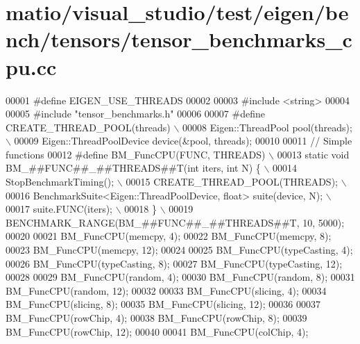 \hypertarget{matio_2visual__studio_2test_2eigen_2bench_2tensors_2tensor__benchmarks__cpu_8cc_source}{}\section{matio/visual\+\_\+studio/test/eigen/bench/tensors/tensor\+\_\+benchmarks\+\_\+cpu.cc}
\label{matio_2visual__studio_2test_2eigen_2bench_2tensors_2tensor__benchmarks__cpu_8cc_source}

\begin{DoxyCode}
00001 \textcolor{preprocessor}{#define EIGEN\_USE\_THREADS}
00002 
00003 \textcolor{preprocessor}{#include <string>}
00004 
00005 \textcolor{preprocessor}{#include "tensor\_benchmarks.h"}
00006 
00007 \textcolor{preprocessor}{#define CREATE\_THREAD\_POOL(threads)             \(\backslash\)}
00008 \textcolor{preprocessor}{Eigen::ThreadPool pool(threads);                \(\backslash\)}
00009 \textcolor{preprocessor}{Eigen::ThreadPoolDevice device(&pool, threads);}
00010 
00011 \textcolor{comment}{// Simple functions}
00012 \textcolor{preprocessor}{#define BM\_FuncCPU(FUNC, THREADS)                                    \(\backslash\)}
00013 \textcolor{preprocessor}{  static void BM\_##FUNC##\_##THREADS##T(int iters, int N) \{           \(\backslash\)}
00014 \textcolor{preprocessor}{    StopBenchmarkTiming();                                           \(\backslash\)}
00015 \textcolor{preprocessor}{    CREATE\_THREAD\_POOL(THREADS);                                     \(\backslash\)}
00016 \textcolor{preprocessor}{    BenchmarkSuite<Eigen::ThreadPoolDevice, float> suite(device, N); \(\backslash\)}
00017 \textcolor{preprocessor}{    suite.FUNC(iters);                                               \(\backslash\)}
00018 \textcolor{preprocessor}{  \}                                                                  \(\backslash\)}
00019 \textcolor{preprocessor}{  BENCHMARK\_RANGE(BM\_##FUNC##\_##THREADS##T, 10, 5000);}
00020 
00021 BM\_FuncCPU(memcpy, 4);
00022 BM\_FuncCPU(memcpy, 8);
00023 BM\_FuncCPU(memcpy, 12);
00024 
00025 BM\_FuncCPU(typeCasting, 4);
00026 BM\_FuncCPU(typeCasting, 8);
00027 BM\_FuncCPU(typeCasting, 12);
00028 
00029 BM\_FuncCPU(random, 4);
00030 BM\_FuncCPU(random, 8);
00031 BM\_FuncCPU(random, 12);
00032 
00033 BM\_FuncCPU(slicing, 4);
00034 BM\_FuncCPU(slicing, 8);
00035 BM\_FuncCPU(slicing, 12);
00036 
00037 BM\_FuncCPU(rowChip, 4);
00038 BM\_FuncCPU(rowChip, 8);
00039 BM\_FuncCPU(rowChip, 12);
00040 
00041 BM\_FuncCPU(colChip, 4);

\end{DoxyCode}
